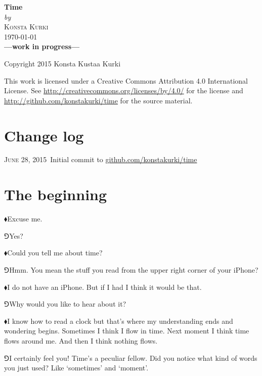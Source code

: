 \documentclass[10pt,oneside%
]{memoir}
\newcommand{\hea}{\(\blacklozenge\)\;}
\newcommand{\heb}{\(\Game\)\;}
\begin{document}
\frontmatter
\begin{titlingpage}
	\begin{centering}
		\HUGE\textbf{Time}\\
		\vspace{0.4em}
		\normalsize\emph{by}\\
		\vspace{0.4em}
		\textsc{Konsta Kurki}\\
		\vspace{0.4em}
		\textsc{\today}\\
		\vspace{5em}
		\textbf{---work in progress---}\\
	\end{centering}
	\vfill

	Copyright {\textcopyright} 2015 Konsta Kustaa Kurki

	This work is licensed under a Creative Commons Attribution 4.0 International License. See \url{http://creativecommons.org/licenses/by/4.0/} for the license and \url{http://github.com/konstakurki/time} for the source material.
\end{titlingpage}
\chapter{Change log}
\textsc{June 28, 2015}\, Initial commit to \url{github.com/konstakurki/time}
\tableofcontents
\mainmatter
\chapter{The beginning}
\hea Excuse me.

\heb Yes?

\hea Could you tell me about time?

\heb Hmm. You mean the stuff you read from the upper right corner of your iPhone?

\hea I do not have an iPhone. But if I had I think it would be that.

\heb Why would you like to hear about it?

\hea I know how to read a clock but that's where my understanding ends and wondering begins. Sometimes I think I flow in time. Next moment I think time flows around me. And then I think nothing flows.

\heb I certainly feel you! Time's a peculiar fellow. Did you notice what kind of words you just used? Like `sometimes' and `moment'.
\end{document}
